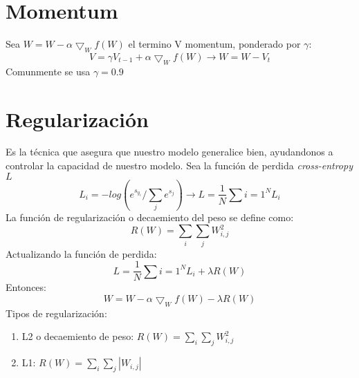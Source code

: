 \documentclass{article}
\begin{document}
\section{Momentum}
Sea $W = W - \alpha \bigtriangledown_{W} f(W)$ el termino V momentum, ponderado por $\gamma$: 
\[
V = \gamma V_{t-1} + \alpha \bigtriangledown_{W} f(W)  \longrightarrow W = W - V_t
\]
Comunmente se usa $\gamma = 0.9$
\section{Regularización}
Es la técnica que asegura que nuestro modelo generalice bien, ayudandonos a controlar la capacidad de nuestro modelo.  Sea la función de perdida \textit{cross-entropy} $L$
\[
L_i = -log(e^{s_{y_i}}/ \sum_je^{s_j}) \longrightarrow L = \frac{1}{N}\sum{i=1}^N L_i
\]
La función de regularización o decaemiento del peso se define como: 
\[
R(W) = \sum_i \sum_j W_{i,j}^2
\]
Actualizando la función de perdida: 
\[
L = \frac{1}{N}\sum{i=1}^N L_i + \lambda R(W)
\]
Entonces: 
\[
W = W - \alpha \bigtriangledown_W f(W) -\lambda R(W)
\]
Tipos de regularización:
\begin{enumerate}
    \item L2 o decaemiento de peso: $R(W)= \sum_i \sum_j W_{i,j}^2$
    \item L1: $R(W)= \sum_i \sum_j |W_{i,j}|$
\end{enumerate}
\end{document}
